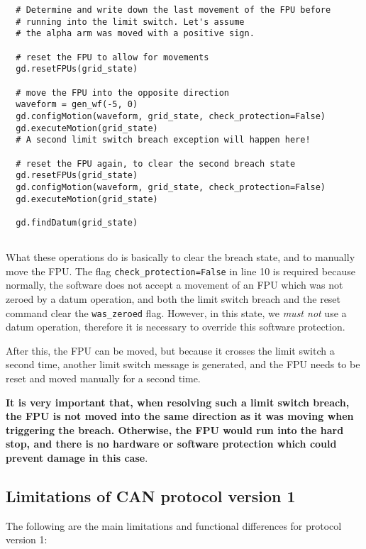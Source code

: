 \documentclass{scrartcl}[12pt,a4paper]
\begin{document}
\begin{verbatim}
  # Determine and write down the last movement of the FPU before
  # running into the limit switch. Let's assume
  # the alpha arm was moved with a positive sign.

  # reset the FPU to allow for movements
  gd.resetFPUs(grid_state)

  # move the FPU into the opposite direction
  waveform = gen_wf(-5, 0)
  gd.configMotion(waveform, grid_state, check_protection=False)
  gd.executeMotion(grid_state)
  # A second limit switch breach exception will happen here!

  # reset the FPU again, to clear the second breach state
  gd.resetFPUs(grid_state)
  gd.configMotion(waveform, grid_state, check_protection=False)
  gd.executeMotion(grid_state)

  gd.findDatum(grid_state)
  
\end{verbatim}
  

What these operations do is basically to clear the breach state, and
to manually move the FPU.  The flag \texttt{check\_protection=False}
in line 10 is required because normally, the software does not accept
a movement of an FPU which was not zeroed by a datum operation, and
both the limit switch breach and the reset command clear the
\texttt{was\_zeroed} flag. However, in this state, we \emph{must not}
use a datum operation, therefore it is necessary to override this
software protection.

After this, the FPU can be moved, but because it crosses the limit
switch a second time, another limit switch message is generated, and
the FPU needs to be reset and moved manually for a second time.

\textbf{It is very important that, when resolving such a limit switch
  breach, the FPU is not moved into the same direction as it was
  moving when triggering the breach.  Otherwise, the FPU would run
  into the hard stop, and there is no hardware or software protection
  which could prevent damage in this case}.


\subsection{Limitations of CAN protocol version 1}

The following are the main limitations and functional
differences for protocol version 1:
\end{document}
